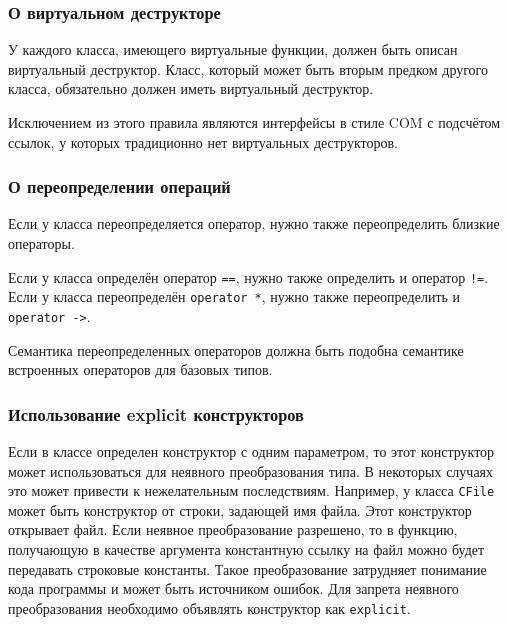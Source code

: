 \newpage
\subsubsection{О виртуальном деструкторе}

У каждого класса, имеющего виртуальные функции, должен быть описан виртуальный деструктор. Класс, который может быть вторым предком другого класса, обязательно должен иметь виртуальный деструктор.

Исключением из этого правила являются интерфейсы в стиле COM с подсчётом ссылок, у которых традиционно нет виртуальных деструкторов.

\subsubsection{О переопределении операций}

Если у класса переопределяется оператор, нужно также переопределить близкие операторы. 

Если у класса определён оператор \lstinline|==|, нужно также определить и оператор \lstinline|!=|. Если у класса переопределён \lstinline|operator *|, нужно также переопределить и \lstinline|operator ->|.

Семантика переопределенных операторов должна быть подобна семантике встроенных операторов для базовых типов.

\subsubsection{Использование explicit конструкторов}

Если в классе определен конструктор с одним параметром, то этот конструктор может использоваться для неявного преобразования типа. В некоторых случаях это может привести к нежелательным последствиям. Например, у класса \lstinline|CFile| может быть конструктор от строки, задающей имя файла. Этот конструктор открывает файл. Если неявное преобразование разрешено, то в функцию, получающую в качестве аргумента константную ссылку на файл можно будет передавать строковые константы. Такое преобразование затрудняет понимание кода программы и может быть источником ошибок. Для запрета неявного преобразования необходимо объявлять конструктор как \lstinline|explicit|.

